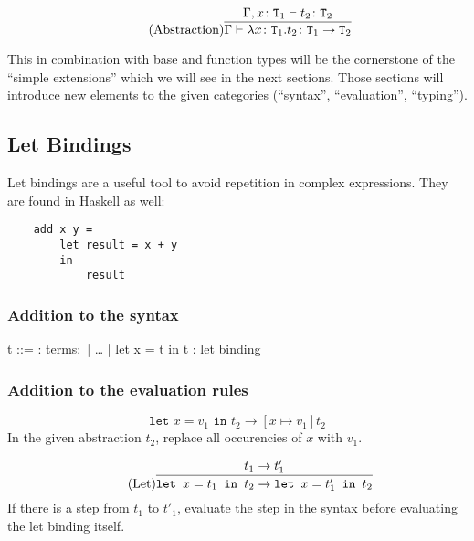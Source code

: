 \begin{equation*}
    \tag{Abstraction}
    \infer{
        \Gamma \vdash \lambda x \colon \texttt{T}_1 . t_2 \colon \texttt{T}_1 \rightarrow \texttt{T}_2
    }{
        \Gamma,x \colon \texttt{T}_1 \vdash t_2 \colon \texttt{T}_2
    }
\end{equation*}

This in combination with base and function types will be the
cornerstone of the ``simple extensions'' which we will see in the
next sections. Those sections will introduce new elements to the given
categories (``syntax'', ``evaluation'', ``typing'').

\subsection{Let Bindings}
\label{subsec:let}

Let bindings are a useful tool to avoid repetition in complex expressions.
They are found in Haskell as well:

\begin{verbatim}
    add x y =
        let result = x + y
        in
            result
\end{verbatim}

\subsubsection{Addition to the syntax \cite{pierce2002ProgLang}}
\begin{bnfgrammar}
    t ::= : terms$\colon$
    | \dots
    | let x = t in t : let binding
\end{bnfgrammar}\leavevmode\newline

\subsubsection{Addition to the evaluation rules \cite{pierce2002ProgLang}}
\begin{equation*}
    \tag{Let-Bind Value}
    \texttt{let } x = v_1 \texttt{ in } t_2 \rightarrow [x \mapsto v_1] t_2
\end{equation*}
In the given abstraction $t_2$, replace all occurencies of $x$ with $v_1$.

\begin{equation*}
    \tag{Let}
    \infer{
        \texttt{let } x=t_1 \texttt{ in } t_2 \rightarrow \texttt{let } x=t'_1 \texttt{ in } t_2
    }{
        t_1 \rightarrow t'_1
    }
\end{equation*}
If there is a step from $t_1$ to $t'_1$, evaluate the step
in the syntax before evaluating the let binding itself.

